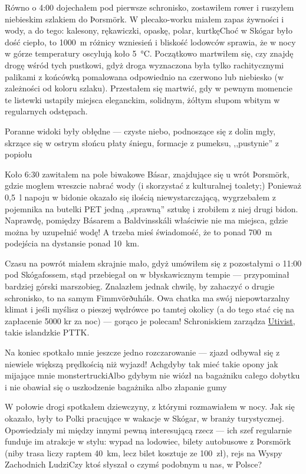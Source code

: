 Równo o 4:00 dojechałem pod pierwsze schronisko, zostawiłem rower i ruszyłem niebieskim szlakiem do Þorsmörk. W plecako-worku miałem zapas żywności i wody, a do tego: kalesony, rękawiczki, opaskę, polar, kurtkę\textellipsis Choć w Skógar było dość ciepło, to 1000~m różnicy wzniesień i bliskość lodowców sprawia, że w nocy w górze temperatury oscylują koło 5~°C. Początkowo martwiłem się, czy znajdę drogę wśród tych pustkowi, gdyż droga wyznaczona była tylko rachitycznymi palikami z końcówką pomalowana odpowiednio na czerwono lub niebiesko (w zależności od koloru szlaku). Przestałem się martwić, gdy w pewnym momencie te listewki ustapiły miejsca eleganckim, solidnym, żółtym słupom wbitym w regularnych odstępach.

Poranne widoki były obłędne --- czyste niebo, podnoszące się z dolin mgły, skrzące się w ostrym słońcu płaty śniegu, formacje z pumeksu, ,,pustynie'' z popiołu\textellipsis


Koło 6:30 zawitałem na pole biwakowe Básar,  znajdujące się u wrót Þorsmörk, gdzie mogłem wreszcie nabrać wody (i skorzystać z kulturalnej toalety;) Ponieważ 0,5~l napoju w bidonie okazało się ilością niewystarczającą, wygrzebałem z pojemnika na butelki PET jedną ,,sprawną'' sztukę i zrobiłem z niej drugi bidon. Naprawdę, pomiędzy Básarem a Baldvinsskáli właściwie nie ma miejsca, gdzie można by uzupełnić wodę! A trzeba mieś świadomość, że to ponad 700~m podejścia na dystansie ponad 10~km.

Czasu na powrót miałem skrajnie mało, gdyż umówiłem się z pozostałymi o 11:00 pod Skógafossem, stąd przebiegał on w błyskawicznym tempie --- przypominał bardziej górski marszobieg. Znalazłem jednak chwilę, by zahaczyć o drugie schronisko, to na samym Fimmvörðuháls. Owa chatka ma swój niepowtarzalny klimat i jeśli myślisz o pieszej wędrówce po tamtej okolicy (a do tego stać cię na zapłacenie 5000 kr za noc) --- gorąco je polecam! Schroniskiem zarządza \href{http://www.utivist.is/english}{Utivist}, takie islandzkie PTTK.

Na koniec spotkało mnie jeszcze jedno rozczarowanie --- zjazd odbywał się z niewiele większą prędkością niż wyjazd! Ach\textellipsis gdyby tak mieć takie opony jak mijające mnie monstertrucki\textellipsis Albo gdybym nie wiózł na bagażniku całego dobytku i nie obawiał się o uszkodzenie bagażnika albo złapanie gumy\textellipsis

W połowie drogi spotkałem dziewczyny, z którymi rozmawiałem w nocy. Jak się okazało, były to Polki pracujące w wakacje w Skógar, w branży turystycznej. Opowiedziały mi między innymi pewną interesującą rzecz --- ich szef regularnie funduje im atrakcje w stylu: wypad na lodowiec, bilety autobusowe z Þorsmörk (niby trasa liczy raptem 40~km, lecz bilet kosztuje ze 100~zł), rejs na Wyspy Zachodnich Ludzi\textellipsis Czy ktoś słyszał o czymś podobnym u nas, w Polsce?

